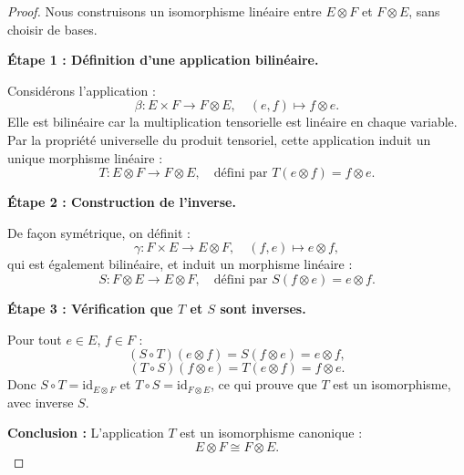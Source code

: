 \documentclass[12pt]{article}
\begin{document}
	\begin{proof}
		Nous construisons un isomorphisme linéaire entre \( E \otimes F \) et \( F \otimes E \), sans choisir de bases.
		
		\textbf{Étape 1 : Définition d'une application bilinéaire.}
		
		Considérons l'application :
		\[
		\beta : E \times F \to F \otimes E, \quad (e, f) \mapsto f \otimes e.
		\]
		Elle est bilinéaire car la multiplication tensorielle est linéaire en chaque variable. Par la propriété universelle du produit tensoriel, cette application induit un unique morphisme linéaire :
		\[
		T : E \otimes F \to F \otimes E, \quad \text{défini par } T(e \otimes f) = f \otimes e.
		\]
		
		\textbf{Étape 2 : Construction de l'inverse.}
		
		De façon symétrique, on définit :
		\[
		\gamma : F \times E \to E \otimes F, \quad (f, e) \mapsto e \otimes f,
		\]
		qui est également bilinéaire, et induit un morphisme linéaire :
		\[
		S : F \otimes E \to E \otimes F, \quad \text{défini par } S(f \otimes e) = e \otimes f.
		\]
		
		\textbf{Étape 3 : Vérification que \( T \) et \( S \) sont inverses.}
		
		Pour tout \( e \in E \), \( f \in F \) :
		\[
		(S \circ T)(e \otimes f) = S(f \otimes e) = e \otimes f,
		\]
		\[
		(T \circ S)(f \otimes e) = T(e \otimes f) = f \otimes e.
		\]
		Donc \( S \circ T = \mathrm{id}_{E \otimes F} \) et \( T \circ S = \mathrm{id}_{F \otimes E} \), ce qui prouve que \( T \) est un isomorphisme, avec inverse \( S \).
		
		\textbf{Conclusion :} L'application \( T \) est un isomorphisme canonique :
		\[
		\boxed{E \otimes F \cong F \otimes E}.
		\]
	\end{proof}
	
	
\end{document}
